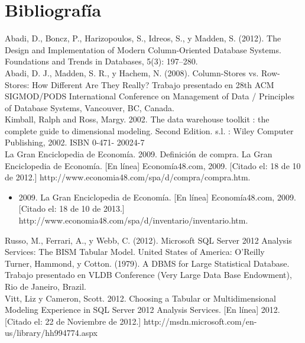 \section*{Bibliografía}
\printbibliography[heading=bibintoc]


Abadi, D., Boncz, P., Harizopoulos, S., Idreos, S., y Madden, S. (2012). The Design and Implementation of Modern Column-Oriented Database Systems. Foundations and Trends in Databases, 5(3): 197–280.\\

Abadi, D. J., Madden, S. R., y Hachem, N. (2008). Column-Stores vs. Row-Stores: How Different Are They Really? Trabajo presentado en 28th ACM SIGMOD/PODS International Conference on Management of Data / Principles of Database Systems, Vancouver, BC, Canada.\\

Kimball, Ralph and Ross, Margy. 2002. The data warehouse toolkit : the complete guide to dimensional modeling. Second Edition. s.l. : Wiley Computer Publishing, 2002. ISBN 0-471- 20024-7\\

La Gran Enciclopedia de Economía. 2009. Definición de compra. La Gran Enciclopedia de Economía. [En línea] Economía48.com, 2009. [Citado el: 18 de 10 de 2012.] http://www.economia48.com/spa/d/compra/compra.htm.
\begin{itemize}
\item 2009. La Gran Enciclopedia de Economía. [En línea] Economía48.com, 2009. [Citado el: 18 de 10 de 2013.] http://www.economia48.com/spa/d/inventario/inventario.htm.
\end{itemize}

Russo, M., Ferrari, A., y Webb, C. (2012). Microsoft SQL Server 2012 Analysis Services: The BISM Tabular Model. United States of America: O’Reilly\\

Turner, Hammond, y Cotton. (1979). A DBMS for Large Statistical Database. Trabajo presentado en VLDB Conference (Very Large Data Base Endowment), Rio de Janeiro, Brazil.\\

Vitt, Liz y Cameron, Scott. 2012. Choosing a Tabular or Multidimensional Modeling Experience in SQL Server 2012 Analysis Services. [En línea] 2012. [Citado el: 22 de Noviembre de 2012.] http://msdn.microsoft.com/en-us/library/hh994774.aspx

